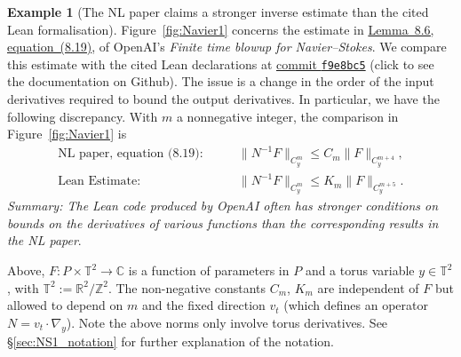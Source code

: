 \documentclass[10pt, a4paper, reqno]{amsart}
\numberwithin{equation}{section}
\renewcommand{\leq}{\leqslant}
\theoremstyle{definition}
\newtheorem{example}[theorem]{Example}
\theoremstyle{definition}
\newcounter{constant}
\begin{document}
\begin{example}[The NL paper claims a stronger inverse estimate than the cited Lean formalisation]\label{ex:Navier_strong}
Figure~\ref{fig:Navier1} concerns the estimate in
\href{https://cdn.openai.com/pdf/32d9f210-8b73-45e0-91bc-82a30aef8a9a/navier-stokes.pdf\#page=95}{Lemma~8.6, equation~(8.19)}, of OpenAI's \emph{Finite time blowup for Navier--Stokes}.
We compare this estimate with the cited Lean declarations at
\href{https://github.com/openai/NavierStokesAndEuler/tree/f9e8bc5b38b6e212696e8a30e3e91517af887bbd}{commit \texttt{f9e8bc5}} (click to see the documentation on Github).
The issue is a change in the order of the input derivatives required to bound the output derivatives. In particular, we have the following discrepancy. With $m$ a nonnegative integer, the comparison in Figure~\ref{fig:Navier1} is
\begin{align}
 \text{NL paper, equation (8.19):}\qquad
 &\|N^{-1}F\|_{C_y^m}\leq C_m\|F\|_{C_y^{m+4}}, \label{eq:Navier-inverse-comparison}
\\
 \text{Lean Estimate:}\qquad
 &\|N^{-1}F\|_{C_y^m}\leq K_m\|F\|_{C_y^{m+5}}. \label{eq:Navier-inverse-comparison-Lean}
\end{align}
\emph{Summary: The Lean code produced by OpenAI often has stronger conditions on bounds on the derivatives of various functions than the corresponding results in the NL paper}.

Above, $F : P \times \mathbb{T}^2 \to \mathbb{C}$ is a function of parameters in $P$ and a torus variable $y \in \mathbb{T}^2$, with $\mathbb{T}^2:= \mathbb{R}^2/\mathbb{Z}^2$. The non-negative constants $C_m$, $K_m$ are independent of $F$ but allowed to depend on $m$ and the fixed direction $v_t$ (which defines an operator $N = v_t \cdot \nabla_y$). Note the above norms only involve torus derivatives. See \S\ref{sec:NS1_notation} for further explanation of the notation.
\end{example}
\end{document}
